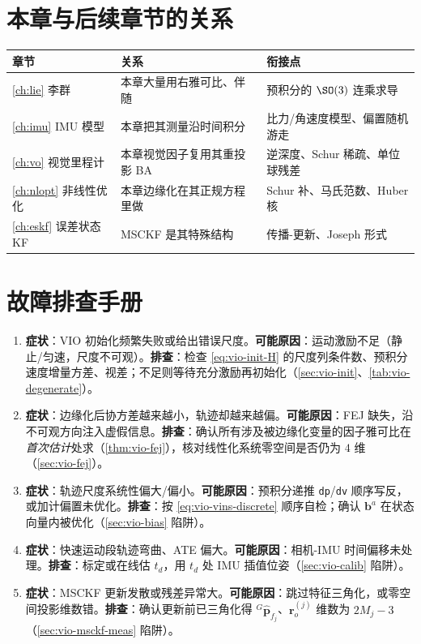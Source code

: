\section*{本章与后续章节的关系}
\begin{table}[H]\centering\small
\begin{tabular}{lll}
\toprule
章节 & 关系 & 衔接点 \\
\midrule
\cref{ch:lie} 李群 & 本章大量用右雅可比、伴随 & 预积分的 $\SO(3)$ 连乘求导 \\
\cref{ch:imu} IMU 模型 & 本章把其测量沿时间积分 & 比力/角速度模型、偏置随机游走 \\
\cref{ch:vo} 视觉里程计 & 本章视觉因子复用其重投影 BA & 逆深度、Schur 稀疏、单位球残差 \\
\cref{ch:nlopt} 非线性优化 & 本章边缘化在其正规方程里做 & Schur 补、马氏范数、Huber 核 \\
\cref{ch:eskf} 误差状态 KF & MSCKF 是其特殊结构 & 传播-更新、Joseph 形式 \\
\bottomrule
\end{tabular}
\end{table}

\section*{故障排查手册}
\begin{enumerate}
  \item \textbf{症状}：VIO 初始化频繁失败或给出错误尺度。\textbf{可能原因}：运动激励不足（静止/匀速，尺度不可观）。\textbf{排查}：检查 \cref{eq:vio-init-H} 的尺度列条件数、预积分速度增量方差、视差；不足则等待充分激励再初始化（\cref{sec:vio-init}、\cref{tab:vio-degenerate}）。
  \item \textbf{症状}：边缘化后协方差越来越小，轨迹却越来越偏。\textbf{可能原因}：FEJ 缺失，沿不可观方向注入虚假信息。\textbf{排查}：确认所有涉及被边缘化变量的因子雅可比在\emph{首次估计}处求（\cref{thm:vio-fej}），核对线性化系统零空间是否仍为 $4$ 维（\cref{sec:vio-fej}）。
  \item \textbf{症状}：轨迹尺度系统性偏大/偏小。\textbf{可能原因}：预积分递推 \texttt{dp}/\texttt{dv} 顺序写反，或加计偏置未优化。\textbf{排查}：按 \cref{eq:vio-vins-discrete} 顺序自检；确认 $\mathbf{b}^a$ 在状态向量内被优化（\cref{sec:vio-bias} 陷阱）。
  \item \textbf{症状}：快速运动段轨迹弯曲、ATE 偏大。\textbf{可能原因}：相机-IMU 时间偏移未处理。\textbf{排查}：标定或在线估 $t_d$，用 $t_d$ 处 IMU 插值位姿（\cref{sec:vio-calib} 陷阱）。
  \item \textbf{症状}：MSCKF 更新发散或残差异常大。\textbf{可能原因}：跳过特征三角化，或零空间投影维数错。\textbf{排查}：确认更新前已三角化得 ${}^G\hat{\mathbf{p}}_{f_j}$、$\mathbf{r}_o^{(j)}$ 维数为 $2M_j-3$（\cref{sec:vio-msckf-meas} 陷阱）。
\end{enumerate}

